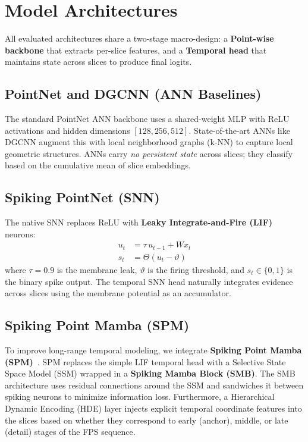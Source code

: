 \documentclass[11pt,a4paper]{article}
\begin{document}
\section{Model Architectures}

All evaluated architectures share a two-stage macro-design: a \textbf{Point-wise backbone}
that extracts per-slice features, and a \textbf{Temporal head} that maintains state
across slices to produce final logits.

\subsection{PointNet and DGCNN (ANN Baselines)}

The standard PointNet ANN backbone uses a shared-weight MLP with ReLU activations
and hidden dimensions $[128, 256, 512]$. State-of-the-art ANNs like DGCNN augment this
with local neighborhood graphs (k-NN) to capture local geometric structures.
ANNs carry \emph{no persistent state} across slices; they classify based on the
cumulative mean of slice embeddings.

\subsection{Spiking PointNet (SNN)}

The native SNN replaces ReLU with \textbf{Leaky Integrate-and-Fire (LIF)} neurons:
\begin{align}
  u_t &= \tau \, u_{t-1} + W x_t  \label{eq:mem}\\
  s_t &= \Theta(u_t - \vartheta)   \label{eq:spike}
\end{align}
where $\tau = 0.9$ is the membrane leak, $\vartheta$ is the firing threshold,
and $s_t \in \{0,1\}$ is the binary spike output. The temporal SNN head naturally
integrates evidence across slices using the membrane potential as an accumulator.

\subsection{Spiking Point Mamba (SPM)}

To improve long-range temporal modeling, we integrate \textbf{Spiking Point Mamba
(SPM)}~\cite{spm2025}. SPM replaces the simple LIF temporal head with a Selective
State Space Model (SSM) wrapped in a \textbf{Spiking Mamba Block (SMB)}.
The SMB architecture uses residual connections around the SSM and sandwiches it
between spiking neurons to minimize information loss. Furthermore, a
Hierarchical Dynamic Encoding (HDE) layer injects explicit temporal coordinate
features into the slices based on whether they correspond to early (anchor),
middle, or late (detail) stages of the FPS sequence.
\end{document}
